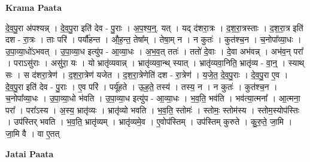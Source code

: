 \documentclass[17pt]{extarticle}
\begin{document}
\textbf{Krama Paata} \newline

दे॒व॒पु॒रा अ॑पश्यन्न् । दे॒व॒पु॒रा इति॑ देव - पु॒राः । अ॒प॒श्य॒न्॒. यत् । यद् द॑शरा॒त्रः । द॒श॒रा॒त्रस्ताः । द॒श॒रा॒त्र इति॑ दश - रा॒त्रः । ताः परि॑ । पर्यौ॑हन्त । औ॒ह॒न्त॒ तेषा᳚म् । तेषा॒म् न । न कुतः॑ । कुत॑श्च॒न । च॒नोपा᳚व्या॒धः । उ॒पा॒व्या॒धो॑ऽभवत् । उ॒पा॒व्या॒ध इत्यु॑प - आ॒व्या॒धः । अ॒भ॒व॒त् ततः॑ । ततो॑ दे॒वाः । दे॒वा अभ॑वन्न् । अभ॑व॒न् परा᳚ । पराऽसु॑राः । असु॑रा॒ यः । यो भ्रातृ॑व्यवान्न् । भ्रातृ॑व्यवा॒न्थ् स्यात् । भ्रातृ॑व्यवा॒निति॒ भ्रातृ॑व्य - वा॒न्॒ । स्याथ् सः । स द॑शरा॒त्रेण॑ । द॒श॒रा॒त्रेण॑ यजेत । द॒श॒रा॒त्रेणेति॑ दश - रा॒त्रेण॑ । य॒जे॒त॒ दे॒व॒पु॒राः । दे॒व॒पु॒रा ए॒व । दे॒व॒पु॒रा इति॑ देव - पु॒राः । ए॒व परि॑ । पर्यू॑हते । ऊ॒ह॒ते॒ तस्य॑ । तस्य॒ न । न कुतः॑ । कुत॑श्च॒न । च॒नोपा᳚व्या॒धः । उ॒पा॒व्या॒धो भ॑वति । उ॒पा॒व्या॒ध इत्यु॑प - आ॒व्या॒धः । भ॒व॒ति॒ भव॑ति । भव॑त्या॒त्मना᳚ । आ॒त्मना॒ परा᳚ । परा᳚ऽस्य । अ॒स्य॒ भ्रातृ॑व्यः । भ्रातृ॑व्यो भवति । भ॒व॒ति॒ स्तोमः॑ । स्तोमः॒ स्तोम॑स्य । स्तोम॒स्योप॑स्तिः । उप॑स्तिर् भवति । भ॒व॒ति॒ भ्रातृ॑व्यम् । भ्रातृ॑व्यमे॒व । ए॒वोप॑स्तिम् । उप॑स्तिम् कुरुते । कु॒रु॒ते॒ जा॒मि । जा॒मि वै । वा ए॒तत् \newline

\textbf{Jatai Paata} \newline
\end{document}
